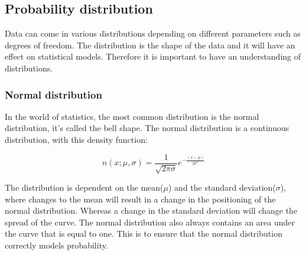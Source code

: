 \subsection{Probability distribution}
Data can come in various distributions depending on different parameters such
as degrees of freedom. The distribution is the shape of the data and it will have
an effect on statistical models. Therefore it is important to have an understanding of distributions.
\subsubsection{Normal distribution}

In the world of statistics, the most common distribution is the normal distribution, it's called the bell shape. The normal distribution is a continuous distribution, with this density function:

\begin{equation}
n(x;\mu,\sigma) =\frac{1}{\sqrt{2\pi\sigma}}e^{-\frac{(x-\mu)}{2\sigma^2}}
\end{equation}

The distribution is dependent on the mean($\mu$) and the standard deviation($\sigma$), where changes to the mean will result in a change in the positioning of the normal distribution. Whereas a change in the standard deviation will change the spread of the curve. The normal distribution also always contains an area under the curve that is equal to one. This is to ensure that the normal distribution correctly models probability.

